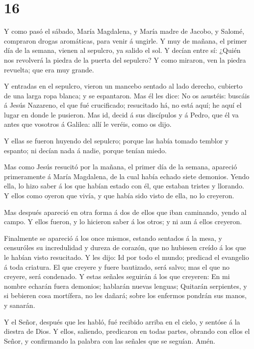 \hypertarget{section-15}{%
\section{16}\label{section-15}}

 Y como pasó el sábado, María Magdalena, y María madre de
Jacobo, y Salomé, compraron drogas aromáticas, para venir á ungirle.
 Y muy de mañana, el primer día de la semana, vienen al
sepulcro, ya salido el sol.  Y decían entre sí: ¿Quién nos
revolverá la piedra de la puerta del sepulcro?  Y como
miraron, ven la piedra revuelta; que era muy grande.

 Y entradas en el sepulcro, vieron un mancebo sentado al
lado derecho, cubierto de una larga ropa blanca; y se espantaron.
 Mas él les dice: No os asustéis: buscáis á Jesús Nazareno,
el que fué crucificado; resucitado há, no está aquí; he aquí el lugar en
donde le pusieron.  Mas id, decid á sus discípulos y á
Pedro, que él va antes que vosotros á Galilea: allí le veréis, como os
dijo.

 Y ellas se fueron huyendo del sepulcro; porque las había
tomado temblor y espanto; ni decían nada á nadie, porque tenían miedo.

 Mas como Jesús resucitó por la mañana, el primer día de la
semana, apareció primeramente á María Magdalena, de la cual había echado
siete demonios.  Yendo ella, lo hizo saber á los que habían
estado con él, que estaban tristes y llorando.  Y ellos
como oyeron que vivía, y que había sido visto de ella, no lo creyeron.

 Mas después apareció en otra forma á dos de ellos que iban
caminando, yendo al campo.  Y ellos fueron, y lo hicieron
saber á los otros; y ni aun á ellos creyeron.

 Finalmente se apareció á los once mismos, estando sentados
á la mesa, y censuróles su incredulidad y dureza de corazón, que no
hubiesen creído á los que le habían visto resucitado.  Y
les dijo: Id por todo el mundo; predicad el evangelio á toda criatura.
 El que creyere y fuere bautizado, será salvo; mas el que
no creyere, será condenado.  Y estas señales seguirán á los
que creyeren: En mi nombre echarán fuera demonios; hablarán nuevas
lenguas;  Quitarán serpientes, y si bebieren cosa
mortífera, no les dañará; sobre los enfermos pondrán sus manos, y
sanarán.

 Y el Señor, después que les habló, fué recibido arriba en
el cielo, y sentóse á la diestra de Dios.  Y ellos,
saliendo, predicaron en todas partes, obrando con ellos el Señor, y
confirmando la palabra con las señales que se seguían. Amén.
